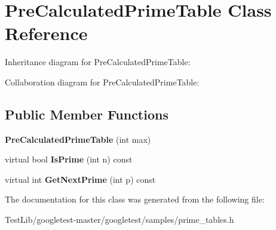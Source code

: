 \hypertarget{classPreCalculatedPrimeTable}{}\section{Pre\+Calculated\+Prime\+Table Class Reference}
\label{classPreCalculatedPrimeTable}


Inheritance diagram for Pre\+Calculated\+Prime\+Table\+:


Collaboration diagram for Pre\+Calculated\+Prime\+Table\+:
\subsection*{Public Member Functions}
\begin{DoxyCompactItemize}
\item 
\mbox{\label{classPreCalculatedPrimeTable_a6bb947504421e31da70d2c71576be350}} 
{\bfseries Pre\+Calculated\+Prime\+Table} (int max)
\item 
\mbox{\label{classPreCalculatedPrimeTable_a8a9ab7f99b09e5e987933c260e7304cf}} 
virtual bool {\bfseries Is\+Prime} (int n) const
\item 
\mbox{\label{classPreCalculatedPrimeTable_a0ff10b1fe13df7e56b8d7ed9f41d3998}} 
virtual int {\bfseries Get\+Next\+Prime} (int p) const
\end{DoxyCompactItemize}


The documentation for this class was generated from the following file\+:\begin{DoxyCompactItemize}
\item 
Test\+Lib/googletest-\/master/googletest/samples/prime\+\_\+tables.\+h\end{DoxyCompactItemize}
